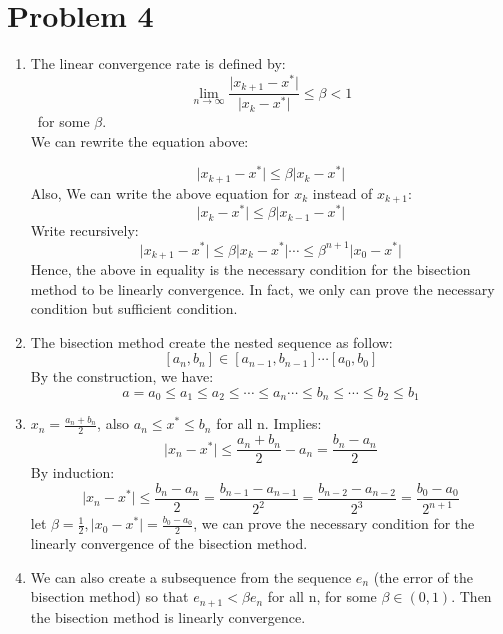 \documentclass[11pt]{article}
\newcommand{\1}{\mathbbm{1}}
\begin{document}
\section*{Problem 4}
\begin{enumerate}
\item The linear convergence rate is defined by:
$$\lim_{n \to\infty} \frac{\vert x_{k+1}-x^{*} \vert}{\vert x_{k}-x^{*} \vert} \leq \beta < 1$$\, for some $\beta$.\\
We can rewrite the equation above:

$$
\vert x_{k+1}-x^{*}\vert  \leq \beta \vert x_{k}-x^{*} \vert
$$
Also, We can write the above equation for $x_k$ instead of $x_{k+1}$:
$$\vert x_{k}-x^{*} \vert \leq \beta \vert x_{k-1}-x^{*} \vert
$$
Write recursively:
$$\vert x_{k+1}-x^{*}\vert  \leq \beta \vert x_{k}-x^{*} \vert \cdots \leq \beta^{n+1} \vert x_{0}-x^{*}\vert$$
Hence, the above in equality is the necessary condition for the bisection method to be linearly convergence. In fact, we only can prove the necessary condition but sufficient condition.
\item The bisection method create the nested sequence as follow:
$$[a_n,b_n]\in [a_{n-1},b_{n-1}] \cdots [a_0,b_0]$$
By the construction, we have:
$$a=a_0\leq a_1 \leq a_2 \leq  \cdots \leq a_n \cdots  \leq  b_n \leq \cdots \leq b_2 \leq b_1$$
\item $x_n = \frac{a_n+b_n}{2}$, also $a_n \leq x^* \leq b_n$ for all n.
Implies:
$$\vert x_n -x^* \vert \leq \frac{a_n+b_n}{2} - a_n  = \frac{b_n-a_n}{2}$$
By induction: \\

$$\vert x_n -x^* \vert  \leq \frac{b_n - a_n}{2} =  \frac{b_{n-1} - a_{n-1} }{2^2} =  \frac{b_{n-2} - a_{n-2} }{2^3} =  \frac{b_0 - a_0 }{2^{n+1}}$$
let $\beta = \frac{1}{2}, $$\vert x_0 -x^* \vert  = \frac{b_0-a_0}{2}$, we can prove the necessary condition for the linearly convergence of the bisection method.\\
\item We can also create a subsequence from the sequence $e_n$ (the error of the bisection method) so that $e_{n+1} < \beta e_n$ for all n, for some $\beta \in (0,1)$. Then the bisection method is linearly convergence.
\end{enumerate}
\end{document}
